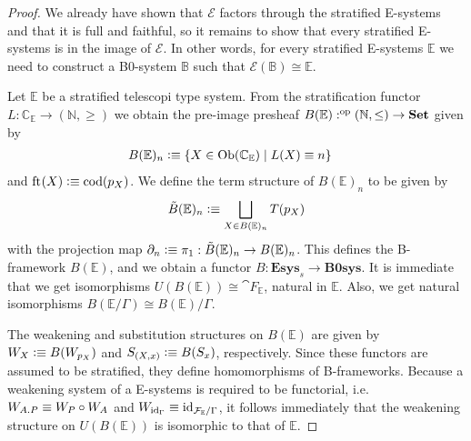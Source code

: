 \begin{proof}
We already have shown that $\mathcal{E}$ factors through the stratified
E-systems and that it is full and faithful, so it remains
to show that every stratified E-systems is in the image of $\mathcal{E}$. In
other words, for every stratified E-systems $\mathbb{E}$ we need to construct
a B0-system $\mathbb{B}$ such that $\mathcal{E}(\mathbb{B})\cong\mathbb{E}$. 

Let $\mathbb{E}$ be a stratified telescopi type system. From the stratification functor
$L:\mathbb{C}_{\mathbb{E}}\to (\mathbb{N},\geq)$ we obtain the pre-image
presheaf $B(\mathbb{E}):\op{(\mathbb{N},\leq)}\to\mathbf{Set}$ given by
\begin{align*}
B(\mathbb{E})_n & \defeq \{X\in\mathrm{Ob}(\mathbb{C}_{\mathbb{E}})\mid L(X)\jdeq n\}
\end{align*}
and $\eft(X)\defeq\mathrm{cod}(p_X)$. We define the term structure of $B(\mathbb{E})_n$
to be given by
\begin{equation*}
\tilde{B}(\mathbb{E})_n \defeq \bigsqcup_{X\in B(\mathbb{E})_n} T(p_X)
\end{equation*}
with the projection map $\ebd[n]\defeq\pi_1:\tilde{B}(\mathbb{E})_n\to B(\mathbb{E})_n$.
This defines the B-framework $B(\mathbb{E})$, and we obtain a functor
$B:\mathbf{Esys}_s\to\mathbf{B0sys}$. It is immediate that we get isomorphisms
$U(B(\mathbb{E}))\cong\cat{F}_{\mathbb{E}}$, natural in $\mathbb{E}$. Also, we
get natural isomorphisms $B(\mathbb{E}/\Gamma)\cong B(\mathbb{E})/\Gamma$. 

The weakening and substitution structures on
$B(\mathbb{E})$ are given by $W_X\defeq B(W_{p_X})$ and $S_{(X,x)}\defeq B(S_x)$,
respectively. Since these functors are assumed to be stratified, they define
homomorphisms of B-frameworks. Because a weakening system of a E-systems is
required to be functorial, i.e.~$W_{\ctxext{A}{P}}\jdeq W_P\circ W_A$ and
$W_{\catid{\Gamma}}\jdeq\catid{\cat{F}_{\mathbb{E}}/\Gamma}$, it follows
immediately that the weakening structure on $U(B(\mathbb{E}))$ is isomorphic to
that of $\mathbb{E}$. 
\end{proof}

